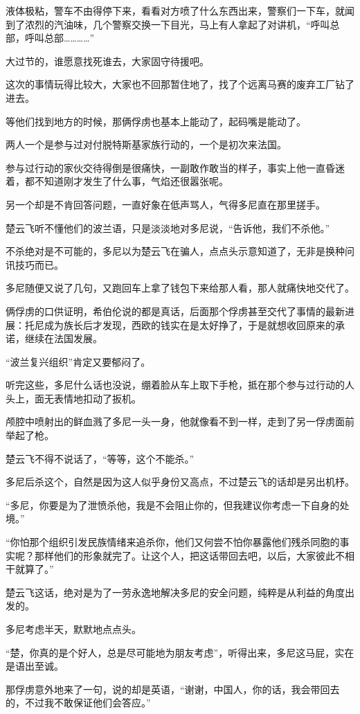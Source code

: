 液体极粘，警车不由得停下来，看看对方喷了什么东西出来，警察们一下车，就闻到了浓烈的汽油味，几个警察交换一下目光，马上有人拿起了对讲机，“呼叫总部，呼叫总部…………”

大过节的，谁愿意找死谁去，大家固守待援吧。

这次的事情玩得比较大，大家也不回那暂住地了，找了个远离马赛的废弃工厂钻了进去。

等他们找到地方的时候，那俩俘虏也基本上能动了，起码嘴是能动了。

两人一个是参与过对付脱特斯基家族行动的，一个是初次来法国。

参与过行动的家伙交待得倒是很痛快，一副敢作敢当的样子，事实上他一直昏迷着，都不知道刚才发生了什么事，气焰还很嚣张呢。

另一个却是不肯回答问题，一直好象在低声骂人，气得多尼直在那里搓手。

楚云飞听不懂他们的波兰语，只是淡淡地对多尼说，“告诉他，我们不杀他。”

不杀绝对是不可能的，多尼以为楚云飞在骗人，点点头示意知道了，无非是换种问讯技巧而已。

多尼随便又说了几句，又跑回车上拿了钱包下来给那人看，那人就痛快地交代了。

俩俘虏的口供证明，希伯伦说的都是真话，后面那个俘虏甚至交代了事情的最新进展：托尼成为族长后才发现，西欧的钱实在是太好挣了，于是就想收回原来的承诺，继续在法国发展。

“波兰复兴组织”肯定又要郁闷了。

听完这些，多尼什么话也没说，绷着脸从车上取下手枪，抵在那个参与过行动的人头上，面无表情地扣动了扳机。

颅腔中喷射出的鲜血溅了多尼一头一身，他就像看不到一样，走到了另一俘虏面前举起了枪。

楚云飞不得不说话了，“等等，这个不能杀。”

多尼后杀这个，自然是因为这人似乎身份又高点，不过楚云飞的话却是另出机杼。

“多尼，你要是为了泄愤杀他，我是不会阻止你的，但我建议你考虑一下自身的处境。”

“你怕那个组织引发民族情绪来追杀你，他们又何尝不怕你暴露他们残杀同胞的事实呢？那样他们的形象就完了。让这个人，把这话带回去吧，以后，大家彼此不相干就算了。”

楚云飞这话，绝对是为了一劳永逸地解决多尼的安全问题，纯粹是从利益的角度出发的。

多尼考虑半天，默默地点点头。

“楚，你真的是个好人，总是尽可能地为朋友考虑”，听得出来，多尼这马屁，实在是语出至诚。

那俘虏意外地来了一句，说的却是英语，“谢谢，中国人，你的话，我会带回去的，不过我不敢保证他们会答应。”


